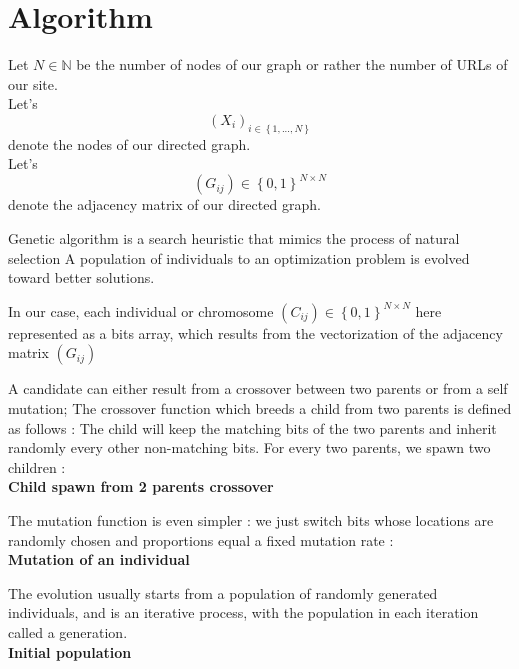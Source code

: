 \documentclass{iSWAGArticle}
\begin{document}
\section{Algorithm}
Let $N \in \mathbb{N}$ be the number of nodes of our graph or rather the number of URLs of our site.
 \\\newline
Let's $$\left(X_i\right)_{i \in \left\{1,...,N\right\}}$$ denote the nodes of our directed graph.
 \\\newline
Let's $$\left(G_{ij}\right)  \in \left\{0,1\right\}^{N\times N}$$ denote the adjacency matrix of our directed graph.



Genetic algorithm is a search heuristic that mimics the process of natural selection 
A population of individuals to an optimization problem is evolved toward better solutions. 

In our case, each individual or chromosome $\left(C_{ij}\right)  \in \left\{0,1\right\}^{N\times N}$ here represented as a bits array, which results from the vectorization of
the adjacency matrix $\left(G_{ij}\right)$


A candidate can either result from a crossover between two parents or from a self mutation;
The crossover function which breeds a child from two parents is defined as follows :
The child will keep the matching bits of the two parents and inherit randomly every other non-matching bits.
For every two parents, we spawn two children :
\\\newline
\textbf{\large Child spawn from 2 parents crossover}
\begin{center}
\end{center}
The mutation function is even simpler : we just switch bits whose locations are randomly chosen
and proportions equal a fixed mutation rate : 
\\\newline
\textbf{\large Mutation of an individual}
\begin{center}
\end{center}

The evolution usually starts from a population of randomly generated individuals, 
and is an iterative process, with the population in each iteration called a generation.
\\\newline
\textbf{\large Initial population}
\begin{center}
\end{center}
\end{document}
